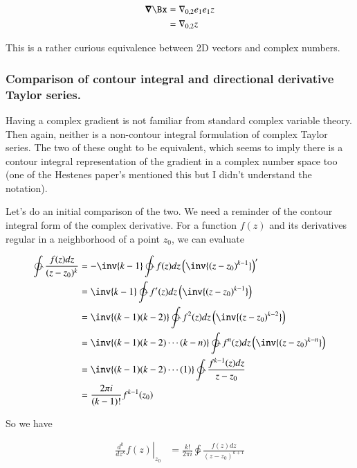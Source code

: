 \begin{align*}
\spacegrad \Bx 
&= \grad_{0,2} e_1 e_1 z \\
&= \grad_{0,2} z \\
\end{align*}

This is a rather curious equivalence between 2D vectors and complex numbers.

\subsubsection{Comparison of contour integral and directional derivative Taylor series. }

Having a complex gradient is not familiar from standard complex variable theory.  Then again, neither is a non-contour integral formulation
of complex Taylor series.  The two of these ought to be equivalent, which seems to imply there is a contour integral representation of the gradient
in a complex number space too (one of the Hestenes paper's mentioned this
but I didn't understand the notation).

Let's do an initial comparison of the two.  We need a reminder
of the contour integral form of the complex derivative.  For a function
$f(z)$ and its derivatives regular in a neighborhood of a point $z_0$, we can evaluate

\begin{align*}
\ointctrclockwise \frac{f(z) dz}{(z - z_0)^k} 
&=
-\inv{k-1} \ointctrclockwise {f(z) dz}\left( \inv{(z - z_0)^{k-1}} \right)' \\
&=
\inv{k-1} \ointctrclockwise {f'(z) dz}\left( \inv{(z - z_0)^{k-1}} \right) \\
&=
\inv{(k-1)(k-2)} \ointctrclockwise {f^2(z) dz}\left( \inv{(z - z_0)^{k-2}} \right) \\
&=
\inv{(k-1)(k-2)\cdots(k-n)} \ointctrclockwise {f^n(z) dz}\left( \inv{(z - z_0)^{k-n}} \right) \\
&=
\inv{(k-1)(k-2)\cdots(1)} \ointctrclockwise \frac{f^{k-1}(z) dz}{z - z_0} \\
&= \frac{2 \pi i}{(k-1)!} f^{k-1}(z_0)
\end{align*}

So we have

\begin{align*}
\left. \frac{d^k}{dz^k} f(z) \right\vert_{z_0}
&= 
\frac{k!}{2 \pi i}\ointctrclockwise \frac{f(z) dz}{(z - z_0)^{k+1}} 
\end{align*}

